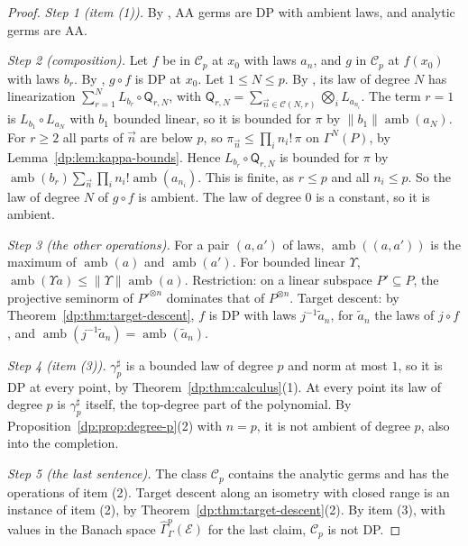 \documentclass[11pt]{amsart}
\theoremstyle{definition}
\theoremstyle{remark}
\numberwithin{equation}{section}
\newcommand{\norm}[1]{\lVert #1\rVert}
\newcommand{\cC}{\mathcal{C}}
\theoremstyle{plain}
\theoremstyle{definition}
\theoremstyle{plain}
\newcommand{\hGamma}{\widehat\Gamma}
\begin{document}
\begin{proof}
\emph{Step 1 (item (1)).} By \cite[Proposition~14.9(1)]{I}, AA germs are DP with ambient laws, and analytic germs are AA.

\emph{Step 2 (composition).} Let $f$ be in $\cC_p$ at $x_0$ with laws $a_n$, and $g$ in $\cC_p$ at $f(x_0)$ with laws $b_r$. By \cite[Lemma~Q.3]{I}, $g\circ f$ is DP at $x_0$. Let $1\le N\le p$. By \cite[Lemma~Q.4]{I}, its law of degree $N$ has linearization $\sum_{r=1}^NL_{b_r}\circ\mathsf Q_{r,N}$, with $\mathsf Q_{r,N}=\sum_{\vec n\in\mathcal C(N,r)}\bigotimes_iL_{a_{n_i}}$. The term $r=1$ is $L_{b_1}\circ L_{a_N}$ with $b_1$ bounded linear, so it is bounded for $\pi$ by $\norm{b_1}\operatorname{amb}(a_N)$. For $r\ge2$ all parts of $\vec n$ are below $p$, so $\pi_{\vec n}\le\prod_in_i!\,\pi$ on $\Gamma^N(P)$, by Lemma~\ref{dp:lem:kappa-bounds}. Hence $L_{b_r}\circ\mathsf Q_{r,N}$ is bounded for $\pi$ by $\operatorname{amb}(b_r)\sum_{\vec n}\prod_in_i!\operatorname{amb}(a_{n_i})$. This is finite, as $r\le p$ and all $n_i\le p$. So the law of degree $N$ of $g\circ f$ is ambient. The law of degree $0$ is a constant, so it is ambient.

\emph{Step 3 (the other operations).} For a pair $(a,a')$ of laws, $\operatorname{amb}((a,a'))$ is the maximum of $\operatorname{amb}(a)$ and $\operatorname{amb}(a')$. For bounded linear $\Upsilon$, $\operatorname{amb}(\Upsilon a)\le\norm\Upsilon\operatorname{amb}(a)$. Restriction: on a linear subspace $P'\subseteq P$, the projective seminorm of $P'^{\otimes n}$ dominates that of $P^{\otimes n}$. Target descent: by Theorem~\ref{dp:thm:target-descent}, $f$ is DP with laws $j^{-1}\tilde a_n$, for $\tilde a_n$ the laws of $j\circ f$, and $\operatorname{amb}(j^{-1}\tilde a_n)=\operatorname{amb}(\tilde a_n)$.

\emph{Step 4 (item (3)).} $\gamma^\sharp_p$ is a bounded law of degree $p$ and norm at most $1$, so it is DP at every point, by Theorem~\ref{dp:thm:calculus}(1). At every point its law of degree $p$ is $\gamma^\sharp_p$ itself, the top-degree part of the polynomial. By Proposition~\ref{dp:prop:degree-p}(2) with $n=p$, it is not ambient of degree $p$, also into the completion.

\emph{Step 5 (the last sentence).} The class $\cC_p$ contains the analytic germs and has the operations of item (2). Target descent along an isometry with closed range is an instance of item (2), by Theorem~\ref{dp:thm:target-descent}(2). By item (3), with values in the Banach space $\hGamma^p_\Gamma(\mathcal E)$ for the last claim, $\cC_p$ is not DP.
\end{proof}
\end{document}
